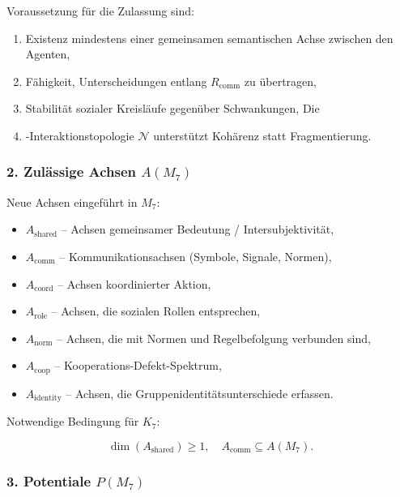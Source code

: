 Voraussetzung für die Zulassung sind:

\begin{enumerate}
    \item Existenz mindestens einer gemeinsamen semantischen Achse zwischen den Agenten,
    \item Fähigkeit, Unterscheidungen entlang $R_{\mathrm{comm}}$ zu übertragen,
    \item Stabilität sozialer Kreisläufe gegenüber Schwankungen,
    Die \item-Interaktionstopologie $\mathcal{N}$ unterstützt Kohärenz statt Fragmentierung.
\end{enumerate}

\subsubsection*{2. Zulässige Achsen \texorpdfstring{$A(M_7)$}{A(M_7)}}

Neue Achsen eingeführt in $M_7$:

\begin{itemize}
    \item $A_{\mathrm{shared}}$ – Achsen gemeinsamer Bedeutung / Intersubjektivität,
    \item $A_{\mathrm{comm}}$ – Kommunikationsachsen (Symbole, Signale, Normen),
    \item $A_{\mathrm{coord}}$ – Achsen koordinierter Aktion,
    \item $A_{\mathrm{role}}$ – Achsen, die sozialen Rollen entsprechen,
    \item $A_{\mathrm{norm}}$ – Achsen, die mit Normen und Regelbefolgung verbunden sind,
    \item $A_{\mathrm{coop}}$ – Kooperations-Defekt-Spektrum,
    \item $A_{\mathrm{identity}}$ – Achsen, die Gruppenidentitätsunterschiede erfassen.
\end{itemize}

Notwendige Bedingung für $K_7$:

\[
\dim(A_{\mathrm{shared}})\ge 1,\quad
A_{\mathrm{comm}}\subseteq A(M_7).
\]

\subsubsection*{3. Potentiale \texorpdfstring{$P(M_7)$}{P(M_7)}}

